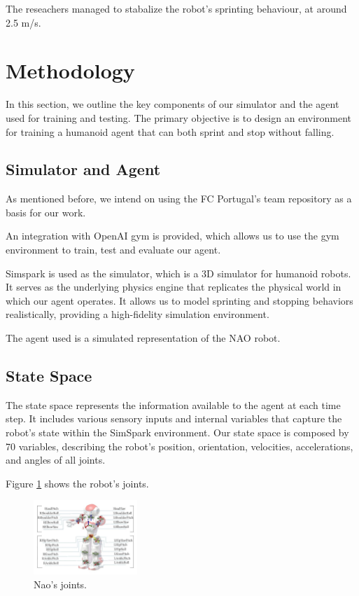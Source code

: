 \documentclass[conference]{IEEEtran}
\begin{document}
The reseachers managed to stabalize the robot's sprinting behaviour, at around 2.5 m/s.

\section{Methodology}\label{Methodology}

In this section, we outline the key components of our simulator and the agent used for training and testing.
The primary objective is to design an environment for training a humanoid agent that can both sprint and stop without falling.


\subsection{Simulator and Agent}\label{Simulator and Agent}

As mentioned before, we intend on using the FC Portugal's team repository as a basis for our work.

An integration with OpenAI gym is provided, which allows us to use the gym environment to train, test and evaluate our agent.

Simspark is used as the simulator, which is a 3D simulator for humanoid robots. It serves as the underlying physics engine that replicates the physical world in which our agent operates.
It allows us to model sprinting and stopping behaviors realistically, providing a high-fidelity simulation environment.

The agent used is a simulated representation of the NAO robot.

\subsection{State Space}\label{State Space}

The state space represents the information available to the agent at each time step. It includes various sensory inputs and internal variables that capture the robot's state within the SimSpark environment.
Our state space is composed by 70 variables, describing the robot's position, orientation, velocities, accelerations, and angles of all joints.

Figure \ref{fig:nao-joints} shows the robot's joints.

\begin{figure}[htbp]
    \centerline{\includegraphics[width=0.35\textwidth]{images/joints.png}}
    \caption{Nao's joints.}
    \label{fig:nao-joints}
\end{figure}
\end{document}
